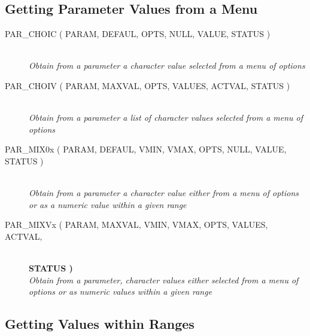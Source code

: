 \documentclass[twoside,11pt]{article}
\newcommand{\htmlref}[2]{#1}
\newcommand{\xlabel}[1]{}
\newcommand{\listline}{\hspace{1pt}\\}
\newcommand{\listova}[1]{}
\newcommand{\listovb}[1]{\textbf{#1}\\}
\newcommand{\listline}{}
\newcommand{\listova}[1]{#1}
\newcommand{\listovb}[1]{}
\begin{document}
\subsection{\xlabel{getting_parameter_values_from_a_menu}Getting Parameter Values from a Menu}

\begin{description}
\item [\htmlref{PAR\_CHOIC}{PAR_CHOIC} 
( PARAM, DEFAUL, OPTS, NULL, VALUE, STATUS )] \listline
\textit{Obtain from a parameter a character value selected from a menu
            of options}
\item [\htmlref{PAR\_CHOIV}{PAR_CHOIV} 
( PARAM, MAXVAL, OPTS, VALUES, ACTVAL, STATUS )] \listline
\textit{Obtain from a parameter a list of character values selected from
            a menu of options}
\item [\htmlref{PAR\_MIX0x}{PAR_MIX0x} 
( PARAM, DEFAUL, VMIN, VMAX, OPTS, NULL, VALUE, STATUS )] \listline
\textit{Obtain from a parameter a character value either from a menu of
             options or as a numeric value within a given range}
\item [\htmlref{PAR\_MIXVx}{PAR_MIXVx} 
( PARAM, MAXVAL, VMIN, VMAX, OPTS, VALUES, ACTVAL, \listova{STATUS )}] \listline
\listovb{STATUS )}
\textit{Obtain from a parameter, character values either selected from a
             menu of options or as numeric values within a given range}
\end{description}

\subsection{\xlabel{getting_values_within_ranges}Getting Values within Ranges}
\end{document}
